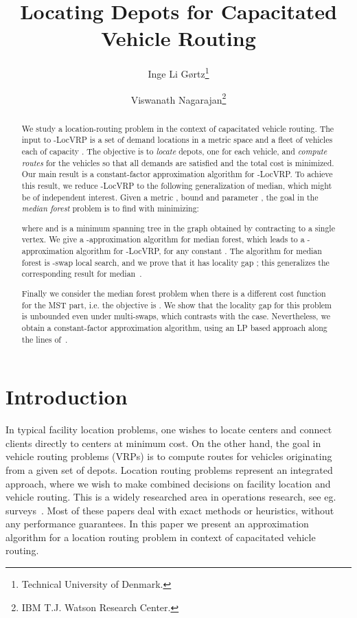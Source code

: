 \documentclass[11pt,twoside,a4paper]{article}
\title{Locating Depots for Capacitated Vehicle Routing}
\author{
Inge Li G{\o}rtz\thanks{Technical University of Denmark.} \and Viswanath Nagarajan\thanks{IBM T.J. Watson Research
Center. } }
\date{}
\def\lrp{-LocVRP\xspace}
\begin{document}
\maketitle
\begin{abstract}
We study a location-routing problem in the context of capacitated vehicle routing. The input to \lrp is a set of demand
locations in a metric space and a fleet of  vehicles each of capacity . The objective is to {\em locate} 
depots, one for each vehicle, and {\em compute routes} for the vehicles so that all demands are satisfied and the total
cost is minimized. Our main result is a constant-factor approximation algorithm for \lrp. To achieve this result, we
reduce \lrp to the following generalization of  median, which might be of independent interest. Given a metric
, bound  and parameter , the goal in the {\em  median forest} problem is to find
 with  minimizing:

where  and  is a minimum spanning tree in the graph obtained by
contracting  to a single vertex. We give a -approximation algorithm for  median forest, which leads
to a -approximation algorithm for \lrp, for any constant . The algorithm for   median
forest is -swap local search, and we prove that it has locality gap ; this generalizes the corresponding
result for  median~\cite{AGKMMP04}.

Finally we consider  the  median forest problem when there is a different cost function  for the MST part, i.e.
the objective is . We show that the locality gap for this problem
is unbounded even under multi-swaps, which contrasts with the  case. Nevertheless,  we obtain a constant-factor
approximation algorithm, using an LP based approach along the lines of~\cite{KKNSS11}.

\end{abstract}

\section{Introduction}\label{sec:intro}
In typical facility location problems, one wishes to locate centers and connect clients directly to centers at minimum
cost. On the other hand, the goal in vehicle routing problems (VRPs) is to compute routes for vehicles originating from
a given set of depots. Location routing problems represent an integrated approach, where we wish to  make combined
decisions on facility location and vehicle routing. This is a widely researched area in operations research, see eg.
surveys~\cite{BWW87,L88,L89,BJS95,MJS98,NS07}. Most of these papers deal with exact methods or heuristics, without any
performance guarantees. In this paper we present an approximation algorithm for a location routing problem in context
of capacitated vehicle routing.
\end{document}
